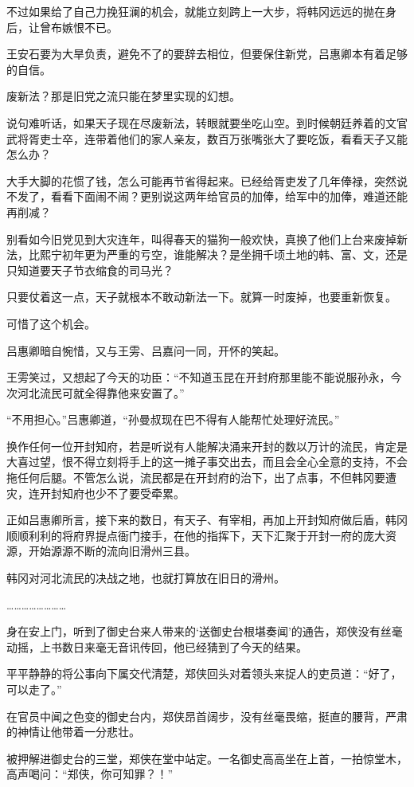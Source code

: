 不过如果给了自己力挽狂澜的机会，就能立刻跨上一大步，将韩冈远远的抛在身后，让曾布嫉恨不已。

王安石要为大旱负责，避免不了的要辞去相位，但要保住新党，吕惠卿本有着足够的自信。

废新法？那是旧党之流只能在梦里实现的幻想。

说句难听话，如果天子现在尽废新法，转眼就要坐吃山空。到时候朝廷养着的文官武将胥吏士卒，连带着他们的家人亲友，数百万张嘴张大了要吃饭，看看天子又能怎么办？

大手大脚的花惯了钱，怎么可能再节省得起来。已经给胥吏发了几年俸禄，突然说不发了，看看下面闹不闹？更别说这两年给官员的加俸，给军中的加俸，难道还能再削减？

别看如今旧党见到大灾连年，叫得春天的猫狗一般欢快，真换了他们上台来废掉新法，比熙宁初年更为严重的亏空，谁能解决？是坐拥千顷土地的韩、富、文，还是只知道要天子节衣缩食的司马光？

只要仗着这一点，天子就根本不敢动新法一下。就算一时废掉，也要重新恢复。

可惜了这个机会。

吕惠卿暗自惋惜，又与王雱、吕嘉问一同，开怀的笑起。

王雱笑过，又想起了今天的功臣：“不知道玉昆在开封府那里能不能说服孙永，今次河北流民可就全得靠他来安置了。”

“不用担心。”吕惠卿道，“孙曼叔现在巴不得有人能帮忙处理好流民。”

换作任何一位开封知府，若是听说有人能解决涌来开封的数以万计的流民，肯定是大喜过望，恨不得立刻将手上的这一摊子事交出去，而且会全心全意的支持，不会拖任何后腿。不管怎么说，流民都是在开封府的治下，出了点事，不但韩冈要遭灾，连开封知府也少不了要受牵累。

正如吕惠卿所言，接下来的数日，有天子、有宰相，再加上开封知府做后盾，韩冈顺顺利利的将府界提点衙门接手，在他的指挥下，天下汇聚于开封一府的庞大资源，开始源源不断的流向旧滑州三县。

韩冈对河北流民的决战之地，也就打算放在旧日的滑州。

……………………

身在安上门，听到了御史台来人带来的‘送御史台根堪奏闻’的通告，郑侠没有丝毫动摇，上书数日来毫无音讯传回，他已经猜到了今天的结果。

平平静静的将公事向下属交代清楚，郑侠回头对着领头来捉人的吏员道：“好了，可以走了。”

在官员中闻之色变的御史台内，郑侠昂首阔步，没有丝毫畏缩，挺直的腰背，严肃的神情让他带着一分悲壮。

被押解进御史台的三堂，郑侠在堂中站定。一名御史高高坐在上首，一拍惊堂木，高声喝问：“郑侠，你可知罪？！”

